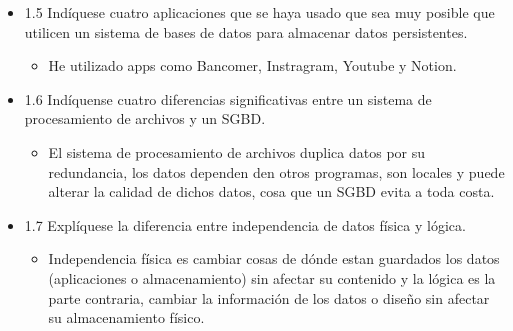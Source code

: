 \documentclass[letterpaper,12pt]{article}
\begin{document}
\begin{sloppypar}
\begin{itemize}
\begin{itemize}
\begin{itemize}
        \end{itemize}
        \item 1.5 Indíquese cuatro aplicaciones que se haya usado que sea muy posible que utilicen un sistema de bases de datos para almacenar datos persistentes.
        \begin{itemize}
            \item He utilizado apps como Bancomer, Instragram, Youtube y Notion.
        \end{itemize} 
        \item 1.6 Indíquense cuatro diferencias significativas entre un sistema de procesamiento de archivos y un SGBD.
        \begin{itemize}
            \item El sistema de procesamiento de archivos duplica datos por su redundancia, los datos dependen den otros programas, son locales y puede alterar la calidad de dichos datos, cosa que un SGBD evita a toda costa.
        \end{itemize}
        \item 1.7 Explíquese la diferencia entre independencia de datos física y lógica. 
        \begin{itemize}
            \item Independencia física es cambiar cosas de dónde estan guardados los datos (aplicaciones o almacenamiento) sin afectar su contenido y la lógica es la parte contraria, cambiar la información de los datos o diseño sin afectar su almacenamiento físico.
        \end{itemize}
    \end{itemize}
\end{itemize}
\newpage

\end{sloppypar}
\end{document}
